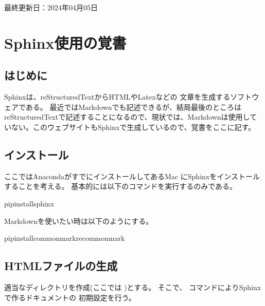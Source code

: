 \documentclass[letterpaper,10pt,dvipdfmx,report]{sphinxmanual}
\begin{document}
\sphinxAtStartPar
最終更新日：2024年04月05日

\sphinxstepscope


\chapter{Sphinx使用の覚書}
\label{\detokenize{sphinx:sphinx}}\label{\detokenize{sphinx::doc}}

\section{はじめに}
\label{\detokenize{sphinx:id1}}
\sphinxAtStartPar
Sphinxは、reStructuredTextからHTMLやLatexなどの
文章を生成するソフトウェアである。
最近ではMarkdownでも記述できるが、結局最後のところはreStructuredTextで記述することになるので、現状では、Markdownは使用していない。このウェブサイトもSphinxで生成しているので、覚書をここに記す。


\section{インストール}
\label{\detokenize{sphinx:id3}}
\sphinxAtStartPar
ここではAnacondaがすでにインストールしてあるMac
にSphinxをインストールすることを考える。
基本的には以下のコマンドを実行するのみである。

\begin{sphinxVerbatim}[commandchars=\\\{\}]
pipinstallsphinx
\end{sphinxVerbatim}

\sphinxAtStartPar
Markdownを使いたい時は以下のようにする。

\begin{sphinxVerbatim}[commandchars=\\\{\}]
pipinstallcommonmarkrecommonmark
\end{sphinxVerbatim}


\section{HTMLファイルの生成}
\label{\detokenize{sphinx:html}}
\sphinxAtStartPar
適当なディレクトリを作成(ここでは  )とする。
そこで、  コマンドによりSphinxで作るドキュメントの
初期設定を行う。
\end{document}
